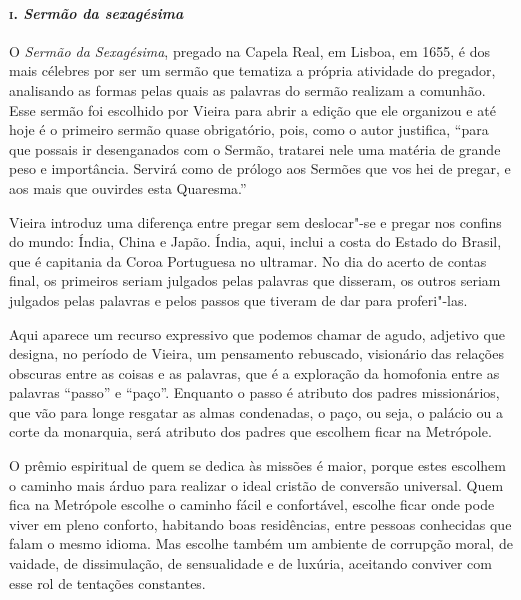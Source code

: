 \paragraph{\textsc{i}. \emph{Sermão da sexagésima}}

O \emph{Sermão da Sexagésima}, pregado na Capela Real, em Lisboa, em
1655, é dos mais célebres por ser um sermão que tematiza a própria
atividade do pregador, analisando as formas pelas quais as palavras do
sermão realizam a comunhão. Esse sermão foi escolhido por Vieira para
abrir a edição que ele organizou e até hoje é o primeiro sermão quase
obrigatório, pois, como o autor justifica, ``para que possais ir
desenganados com o Sermão, tratarei nele uma matéria de grande peso e
importância. Servirá como de prólogo aos Sermões que vos hei de pregar,
e aos mais que ouvirdes esta Quaresma.''

Vieira introduz uma diferença entre pregar sem deslocar"-se e pregar nos
confins do mundo: Índia, China e Japão. Índia, aqui, inclui a costa do
Estado do Brasil, que é capitania da Coroa Portuguesa no ultramar. No
dia do acerto de contas final, os primeiros seriam julgados pelas
palavras que disseram, os outros seriam julgados pelas palavras e pelos
passos que tiveram de dar para proferi"-las.

Aqui aparece um recurso expressivo que podemos chamar de agudo, adjetivo
que designa, no período de Vieira, um pensamento rebuscado, visionário
das relações obscuras entre as coisas e as palavras, que é a exploração
da homofonia entre as palavras ``passo'' e ``paço''. Enquanto o passo é
atributo dos padres missionários, que vão para longe resgatar as almas
condenadas, o paço, ou seja, o palácio ou a corte da monarquia, será
atributo dos padres que escolhem ficar na Metrópole.

O prêmio espiritual de quem se dedica às missões é maior, porque estes
escolhem o caminho mais árduo para realizar o ideal cristão de conversão
universal. Quem fica na Metrópole escolhe o caminho fácil e confortável,
escolhe ficar onde pode viver em pleno conforto, habitando boas
residências, entre pessoas conhecidas que falam o mesmo idioma. Mas
escolhe também um ambiente de corrupção moral, de vaidade, de
dissimulação, de sensualidade e de luxúria, aceitando conviver com esse
rol de tentações constantes.

